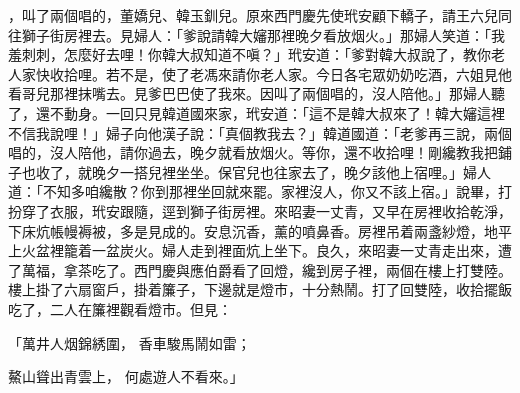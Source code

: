 ，叫了兩個唱的，董嬌兒、韓玉釧兒。原來西門慶先使玳安顧下轎子，請王六兒同往獅子街房裡去。見婦人：「爹說請韓大嬸那裡晚夕看放烟火。」那婦人笑道：「我羞刺刺，怎麼好去哩！你韓大叔知道不嗔？」玳安道：「爹對韓大叔說了，教你老人家快收拾哩。若不是，使了老馮來請你老人家。今日各宅眾奶奶吃酒，六姐見他看哥兒那裡抹嘴去。見爹巴巴使了我來。因叫了兩個唱的，沒人陪他。」那婦人聽了，還不動身。一回只見韓道國來家，玳安道：「這不是韓大叔來了！韓大嬸這裡不信我說哩！」婦子向他漢子說：「真個教我去？」韓道國道：「老爹再三說，兩個唱的，沒人陪他，請你過去，晚夕就看放烟火。等你，還不收拾哩！剛纔教我把鋪子也收了，就晚夕一搭兒裡坐坐。保官兒也往家去了，晚夕該他上宿哩。」婦人道：「不知多咱纔散？你到那裡坐回就來罷。家裡沒人，你又不該上宿。」說畢，打扮穿了衣服，玳安跟隨，逕到獅子街房裡。來昭妻一丈青，又早在房裡收拾乾淨，下床炕帳幔褥被，多是見成的。安息沉香，薰的噴鼻香。房裡吊着兩盞紗燈，地平上火盆裡籠着一盆炭火。婦人走到裡面炕上坐下。良久，來昭妻一丈青走出來，遭了萬福，拿茶吃了。西門慶與應伯爵看了回燈，纔到房子裡，兩個在樓上打雙陸。樓上掛了六扇窗戶，掛着簾子，下邊就是燈市，十分熱鬧。打了回雙陸，收拾擺飯吃了，二人在簾裡觀看燈市。但見：

「萬井人烟錦綉圍，  香車駿馬鬧如雷；

鰲山聳出青雲上，  何處遊人不看來。」

